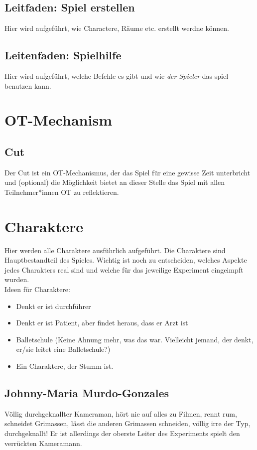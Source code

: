\documentclass[a4paper, 12pt]{scrartcl}
\begin{document}
    \subsection{Leitfaden: Spiel erstellen}
    Hier wird aufgeführt, wie Charactere, Räume etc. erstellt werdne können.
    
    \subsection{Leitenfaden: Spielhilfe}
    Hier wird aufgeführt, welche Befehle es gibt und wie \textit{der Spieler} das spiel benutzen kann.
    

    \section{OT-Mechanism}
    \subsection{Cut} \label{cut}
    Der Cut ist ein OT-Mechanismus, der das Spiel für eine gewisse Zeit unterbricht und (optional) die Möglichkeit bietet an dieser Stelle das Spiel mit allen Teilnehmer*innen OT zu reflektieren. 

    \section{Charaktere}
    Hier werden alle Charaktere ausführlich aufgeführt. Die Charaktere sind Hauptbestandteil des Spieles. Wichtig ist noch zu entscheiden, welches Aspekte jedes Charakters \glqq real\grqq{} sind und welche für das jeweilige Experiment \glqq eingeimpft\grqq{} wurden.\\
    Ideen für Charaktere:
    \begin{itemize}
    \item Denkt er ist durchführer
    \item Denkt er ist Patient, aber findet heraus, dass er Arzt ist
    \item Balletschule (Keine Ahnung mehr, was das war. Vielleicht jemand, der denkt, er/sie leitet eine Balletschule?)
    \item Ein Charaktere, der Stumm ist.
    \end{itemize}

    \subsection{Johnny-Maria Murdo-Gonzales}
    Völlig durchgeknallter Kameraman, hört nie auf alles zu Filmen, rennt rum, schneidet Grimassen, lässt die anderen Grimassen schneiden, völlig irre der Typ, durchgeknallt! 
    Er ist allerdings der oberste Leiter des Experiments \glqq spielt\grqq{} den verrückten Kameramann. 
    
\end{document}
